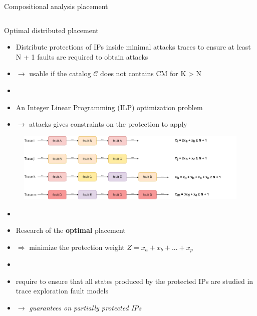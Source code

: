 \begin{frame}[fragile]{Compositional analysis placement}
\begin{columns}
\begin{column}{0.4\textwidth}
\begin{tiny}
            \end{tiny}
        \end{column}
\end{columns}
\end{frame}

\begin{frame}[fragile]{Optimal distributed placement} 
    \begin{tiny}
        \begin{itemize}
            \item  Distribute protections of IPs inside minimal attacks traces to ensure at least N + 1 faults are required to obtain attacks
            \item[] $\rightarrow$ usable if the catalog $\mathcal{C}$ does not contains CM for K > N
            \item[]
            \item An Integer Linear Programming (ILP) optimization problem 
            \item[] $\rightarrow$ attacks gives constraints on the protection to apply
        \end{itemize}
        
        \begin{figure}
            \includegraphics[scale=0.18]{img/placement-eq.drawio.png}
        \end{figure}
        
        \begin{itemize}
            \item[]
            \item[] Research of the \textbf{optimal} placement
            \item[] $\Rightarrow$ minimize the protection weight $Z = x_a + x_b + ... + x_p$
            \item[]
            \item require to ensure that all states produced by the protected IPs are studied in trace exploration fault models 
            \item[] $\rightarrow$ \textit{guarantees on partially protected IPs}
        \end{itemize}
    \end{tiny}
\end{frame}

